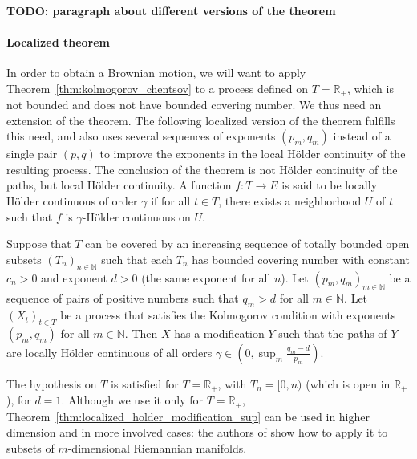 \documentclass[lean]{Draft}
\begin{document}


\paragraph{TODO: paragraph about different versions of the theorem}



\paragraph{Localized theorem}

In order to obtain a Brownian motion, we will want to apply Theorem~\ref{thm:kolmogorov_chentsov} to a process defined on $T = \mathbb{R}_+$, which is not bounded and does not have bounded covering number.
We thus need an extension of the theorem.
The following localized version of the theorem fulfills this need, and also uses several sequences of exponents $(p_m, q_m)$ instead of a single pair $(p, q)$ to improve the exponents in the local Hölder continuity of the resulting process.
The conclusion of the theorem is not Hölder continuity of the paths, but local Hölder continuity.
A function $f : T \to E$ is said to be locally Hölder continuous of order $\gamma$ if for all $t \in T$, there exists a neighborhood $U$ of $t$ such that $f$ is $\gamma$-Hölder continuous on $U$.

\begin{theorem}\label{thm:localized_holder_modification_sup}
Suppose that $T$ can be covered by an increasing sequence of totally bounded open subsets $(T_n)_{n \in \mathbb{N}}$ such that each $T_n$ has bounded covering number with constant $c_n > 0$ and exponent $d > 0$ (the same exponent for all $n$).
Let $(p_m, q_m)_{m \in \mathbb{N}}$ be a sequence of pairs of positive numbers such that $q_m > d$ for all $m \in \mathbb{N}$.
Let $(X_t)_{t \in T}$ be a process that satisfies the Kolmogorov condition with exponents $(p_m, q_m)$ for all $m \in \mathbb{N}$.
Then $X$ has a modification $Y$ such that the paths of $Y$ are locally Hölder continuous of all orders $\gamma \in \left(0, \sup_m \frac{q_m - d}{p_m}\right)$.
\end{theorem}

The hypothesis on $T$ is satisfied for $T = \mathbb{R}_+$, with $T_n = [0,n)$ (which is open in $\mathbb{R}_+$), for $d = 1$.
Although we use it only for $T = \mathbb{R}_+$, Theorem~\ref{thm:localized_holder_modification_sup} can be used in higher dimension and in more involved cases: the authors of \cite{kratschmer2023kolmogorov} show how to apply it to subsets of $m$-dimensional Riemannian manifolds.
\end{document}
